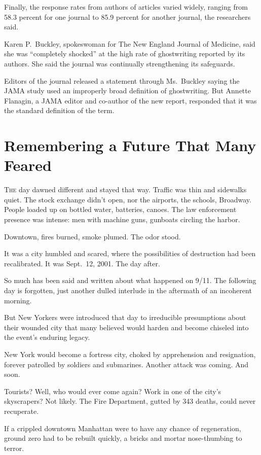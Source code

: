 ﻿\documentclass[12pt]{article}
\begin{document}
Finally, the response rates from authors of articles varied widely, ranging from 58.3 percent for
one journal to 85.9 percent for another journal, the researchers said.

Karen P.~Buckley, spokeswoman for The New England Journal of Medicine, said she was ``completely
shocked'' at the high rate of ghostwriting reported by its authors. She said the journal was
continually strengthening its safeguards.

Editors of the journal released a statement through Ms.~Buckley saying the JAMA study used an
improperly broad definition of ghostwriting. But Annette Flanagin, a JAMA editor and co-author of
the new report, responded that it was the standard definition of the term.

\section{Remembering a Future That Many Feared}

\lettrine{T}{he} day dawned different and stayed that way. Traffic was thin and sidewalks quiet. The
stock exchange didn't open, nor the airports, the schools, Broadway. People loaded up on bottled
water, batteries, canoes. The law enforcement presence was intense: men with machine guns, gunboats
circling the harbor.

Downtown, fires burned, smoke plumed. The odor stood.

It was a city humbled and scared, where the possibilities of destruction had been recalibrated. It
was Sept.~12, 2001. The day after.

So much has been said and written about what happened on 9/11. The following day is forgotten, just
another dulled interlude in the aftermath of an incoherent morning.

But New Yorkers were introduced that day to irreducible presumptions about their wounded city that
many believed would harden and become chiseled into the event's enduring legacy.

New York would become a fortress city, choked by apprehension and resignation, forever patrolled by
soldiers and submarines. Another attack was coming. And soon.

Tourists? Well, who would ever come again? Work in one of the city's skyscrapers? Not likely. The
Fire Department, gutted by 343 deaths, could never recuperate.

If a crippled downtown Manhattan were to have any chance of regeneration, ground zero had to be
rebuilt quickly, a bricks and mortar nose-thumbing to terror.
\end{document}
